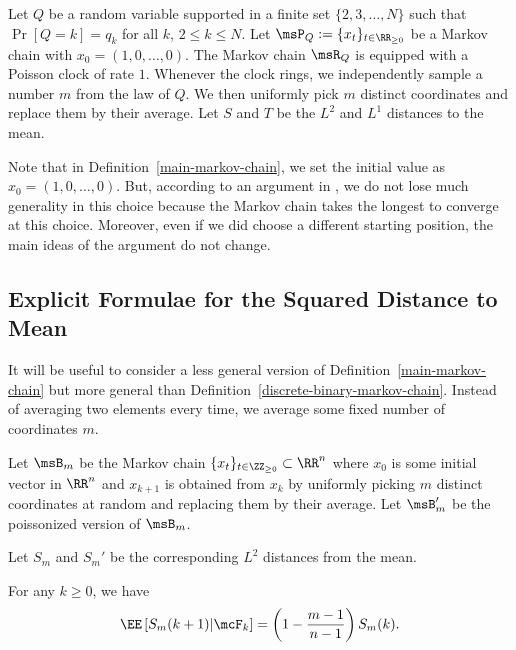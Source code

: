 \documentclass[12pt]{article}
\begin{document}
\begin{defn} \label{main-markov-chain}
	Let $Q$ be a random variable supported in a finite set $\{2, 3, \ldots, N\}$ such that $\Pr[Q = k] = q_k$ for all $k$, $2 \leq k \leq N$. Let $\msP_Q := \{x_t\}_{t \in \RR_{\geq 0}}$ be a Markov chain with $x_0 = (1, 0, \ldots, 0)$. The Markov chain $\msR_Q$ is equipped with a Poisson clock of rate $1$. Whenever the clock rings, we independently sample a number $m$ from the law of $Q$. We then uniformly pick $m$ distinct coordinates and replace them by their average. Let $S$ and $T$ be the $L^2$ and $L^1$ distances to the mean. 
\end{defn} 

Note that in Definition~\ref{main-markov-chain}, we set the initial value as $x_0 = (1, 0, \ldots, 0)$. But, according to an argument in \cite{chatterjee2021phase}, we do not lose much generality in this choice because the Markov chain takes the longest to converge at this choice. Moreover, even if we did choose a different starting position, the main ideas of the argument do not change.

\subsection{Explicit Formulae for the Squared Distance to Mean} 

It will be useful to consider a less general version of Definition~\ref{main-markov-chain} but more general than Definition~\ref{discrete-binary-markov-chain}. Instead of averaging two elements every time, we average some fixed number of coordinates $m$. 

\begin{defn}
	Let $\msB_m$ be the Markov chain $\{x_t\}_{t \in \ZZ_{\geq 0} } \subset \RR^n$ where $x_0$ is some initial vector in $\RR^n$ and $x_{k+1}$ is obtained from $x_k$ by uniformly picking $m$ distinct coordinates at random and replacing them by their average. Let $\msB_m'$ be the poissonized version of $\msB_m$. 
\end{defn}

Let $S_m$ and $S_m'$ be the corresponding $L^2$ distances from the mean.

\begin{prop} \label{explicit-formula-1}
	For any $k \geq 0$, we have 
	\[
		\EE \left [ S_m(k+1) | \mcF_k \right ] = \left ( 1 - \frac{m-1}{n-1} \right ) S_m(k).	
	\]
\end{prop}
\end{document}
